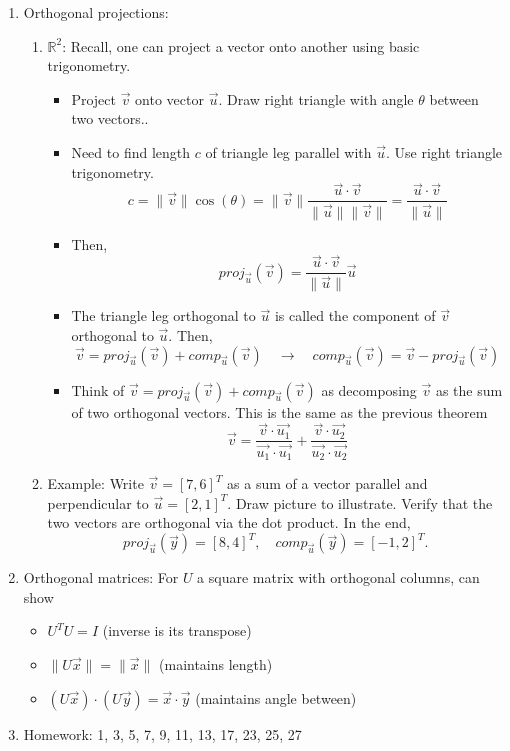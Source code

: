 \documentclass{article}
\begin{document}
\begin{enumerate}
\item Orthogonal projections:
\begin{enumerate}
\item $\mathbb{R}^2$: Recall, one can project a vector onto another using basic trigonometry.
\begin{itemize}
\item Project $\vec{v}$ onto vector $\vec{u}$. Draw right triangle with angle $\theta$ between two vectors.. 
\item Need to find length $c$ of triangle leg parallel with $\vec{u}$. Use right triangle trigonometry.
\[
c = \| \vec{v} \| \cos(\theta) = \| \vec{v} \| \frac{ \vec{u} \cdot \vec{v}}{ \|\vec{u}\| \| \vec{v} \| } = \frac{ \vec{u} \cdot \vec{v}}{ \|\vec{u}\| }
\]
\item Then,
\[
proj_{\vec{u}} (\vec{v}) =  \frac{ \vec{u} \cdot \vec{v}}{ \|\vec{u}\| } \vec{u}
\]
\item The triangle leg orthogonal to $\vec{u}$ is called the component of $\vec{v}$ orthogonal to $\vec{u}$. Then,
\[
\vec{v} = proj_{\vec{u}} (\vec{v}) + comp_{\vec{u}} (\vec{v}) \quad \rightarrow \quad 
comp_{\vec{u}} (\vec{v}) = \vec{v} - proj_{\vec{u}} (\vec{v}) 
\]
\item Think of $\vec{v} = proj_{\vec{u}} (\vec{v}) + comp_{\vec{u}} (\vec{v})$ as decomposing $\vec{v}$ as the sum of two orthogonal vectors. This is the same as the previous theorem
\[
\vec{v} = \frac{\vec{v} \cdot \vec{u_1}}{\vec{u_1} \cdot \vec{u_1}} + \frac{\vec{v} \cdot \vec{u_2}}{\vec{u_2} \cdot \vec{u_2}}
\]
\end{itemize}
\item Example: Write $\vec{v} = [7, 6]^T$ as a sum of a vector parallel and perpendicular to $\vec{u} = [2, 1]^T$. Draw picture to illustrate. Verify that the two vectors are orthogonal via the dot product. In the end,
\[
proj_{\vec{u}}(\vec{y}) = [8, 4]^T, \quad comp_{\vec{u}}(\vec{y}) = [-1, 2]^T.
\]
\end{enumerate}

\item Orthogonal matrices: For $U$ a square matrix with orthogonal columns, can show
\begin{itemize}
\item $U^T U = I$ (inverse is its transpose)
\item $\| U \vec{x} \| = \| \vec{x} \|$ (maintains length)
\item $(U\vec{x}) \cdot (U\vec{y}) = \vec{x} \cdot \vec{y}$ (maintains angle between)
\end{itemize}

\item Homework: 1, 3, 5, 7, 9, 11, 13, 17, 23, 25, 27

\end{enumerate}
\end{document}
